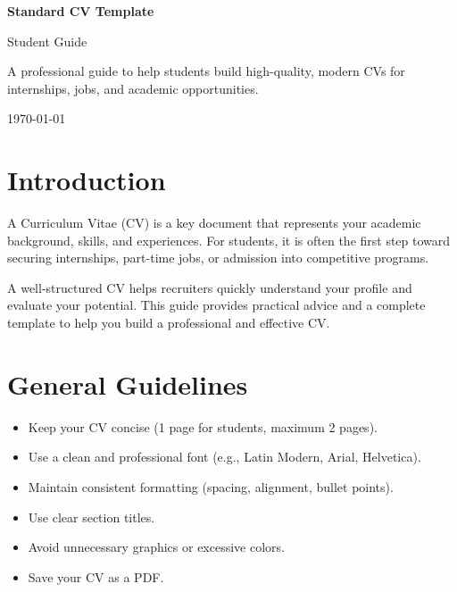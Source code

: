 \documentclass[11pt,a4paper]{article}
\begin{document}
\begin{titlepage}
    \centering
    \vspace*{3cm}
    
    {\Huge \textbf{\textcolor{primary}{Standard CV Template}} \par}
    \vspace{0.5cm}
    {\Large \textcolor{secondary}{Student Guide} \par}
    
    \vspace{2cm}
    
    {\large A professional guide to help students build high-quality, modern CVs for internships, jobs, and academic opportunities.}
    
    \vfill
    
    {\large \today}
    
\end{titlepage}

\section{Introduction}

A Curriculum Vitae (CV) is a key document that represents your academic background, skills, and experiences. For students, it is often the first step toward securing internships, part-time jobs, or admission into competitive programs.

A well-structured CV helps recruiters quickly understand your profile and evaluate your potential. This guide provides practical advice and a complete template to help you build a professional and effective CV.

\section{General Guidelines}

\begin{itemize}
    \item Keep your CV concise (1 page for students, maximum 2 pages).
    \item Use a clean and professional font (e.g., Latin Modern, Arial, Helvetica).
    \item Maintain consistent formatting (spacing, alignment, bullet points).
    \item Use clear section titles.
    \item Avoid unnecessary graphics or excessive colors.
    \item Save your CV as a PDF.
\end{itemize}
\end{document}
